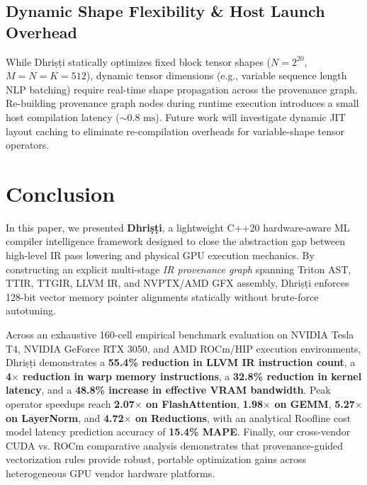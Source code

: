 \documentclass[10pt,journal,compsoc]{IEEEtran}
\begin{document}
\subsection{Dynamic Shape Flexibility \& Host Launch Overhead}
While Dhri\d{s}\d{t}i statically optimizes fixed block tensor shapes ($N = 2^{20}$, $M=N=K=512$), dynamic tensor dimensions (e.g., variable sequence length NLP batching) require real-time shape propagation across the provenance graph. Re-building provenance graph nodes during runtime execution introduces a small host compilation latency ($\sim 0.8\text{ ms}$). Future work will investigate dynamic JIT layout caching to eliminate re-compilation overheads for variable-shape tensor operators.

\section{Conclusion}\label{sec:conclusion}

In this paper, we presented \textbf{Dhri\d{s}\d{t}i}, a lightweight C++20 hardware-aware ML compiler intelligence framework designed to close the abstraction gap between high-level IR pass lowering and physical GPU execution mechanics. By constructing an explicit multi-stage \textit{IR provenance graph} spanning Triton AST, TTIR, TTGIR, LLVM IR, and NVPTX/AMD GFX assembly, Dhri\d{s}\d{t}i enforces 128-bit vector memory pointer alignments statically without brute-force autotuning.

Across an exhaustive 160-cell empirical benchmark evaluation on NVIDIA Tesla T4, NVIDIA GeForce RTX 3050, and AMD ROCm/HIP execution environments, Dhri\d{s}\d{t}i demonstrates a \textbf{55.4\% reduction in LLVM IR instruction count}, a \textbf{4$\times$ reduction in warp memory instructions}, a \textbf{32.8\% reduction in kernel latency}, and a \textbf{48.8\% increase in effective VRAM bandwidth}. Peak operator speedups reach \textbf{2.07$\times$ on FlashAttention}, \textbf{1.98$\times$ on GEMM}, \textbf{5.27$\times$ on LayerNorm}, and \textbf{4.72$\times$ on Reductions}, with an analytical Roofline cost model latency prediction accuracy of \textbf{15.4\% MAPE}. Finally, our cross-vendor CUDA vs. ROCm comparative analysis demonstrates that provenance-guided vectorization rules provide robust, portable optimization gains across heterogeneous GPU vendor hardware platforms.
\end{document}
